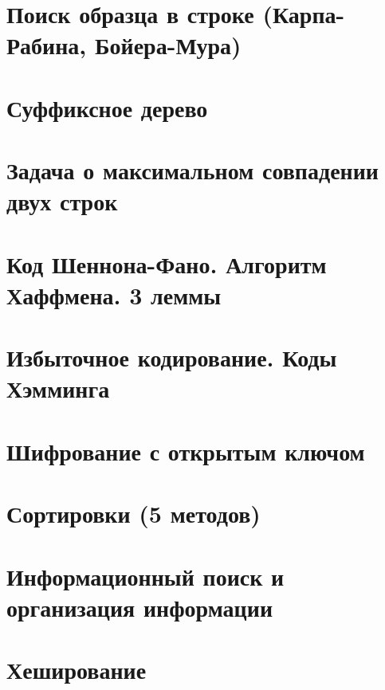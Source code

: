\documentclass[12pt, fleqn]{article}
\begin{document}
\section{Поиск образца в строке (Карпа-Рабина, Бойера-Мура)}


\section{Суффиксное дерево}


\section{Задача о максимальном совпадении двух строк}


\section{Код Шеннона-Фано. Алгоритм Хаффмена. 3 леммы}






\section{Избыточное кодирование. Коды Хэмминга}


\section{Шифрование с открытым ключом}


\section{Сортировки (5 методов)}


\section{Информационный поиск и организация информации}


\section{Хеширование}
\end{document}
